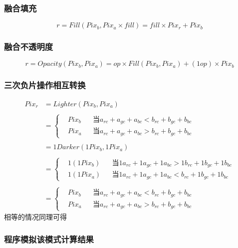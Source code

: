 \subsubsection{ 融合填充}

$$r=Fill(Pix_b,Pix_a\times fill) =fill\times Pix_r+ Pix_b$$

\subsubsection{ 融合不透明度}

$$r=Opacity(Pix_b,Pix_a)=op\times Fill(Pix_b,Pix_a)+(1op)\times Pix_b $$

\subsubsection{ 三次负片操作相互转换}

$$\begin{aligned}Pix_r& =Lighter(Pix_b,Pix_a)\\\\&=\left\{\begin{aligned}&Pix_b &&当 a_{rc}+a_{gc}+a_{bc}<b_{rc}+b_{gc}+b_{bc}\\&Pix_a&&当a_{rc}+a_{gc}+a_{bc}>b_{rc}+b_{gc}+b_{bc}\end{aligned}\right.\\\\&=1Darker(1Pix_b,1Pix_a)\\\\&=\left\{\begin{aligned}&1(1Pix_b) &&当 1a_{rc}+1a_{gc}+1a_{bc}>1b_{rc}+1b_{gc}+1b_{bc}\\&1(1Pix_a)&& 当 1a_{rc}+1a_{gc}+1a_{bc}<b_{rc}+1b_{gc}+1b_{bc}\end{aligned}\right. \\\\&=\left\{\begin{aligned}&Pix_b&&当 a_{rc}+a_{gc}+a_{bc}<b_{rc}+b_{gc}+b_{bc}\\&Pix_a&& 当 a_{rc}+a_{gc}+a_{bc}>b_{rc}+b_{gc}+b_{bc}\end{aligned}\right.\end{aligned}$$
相等的情况同理可得

\subsubsection{ 程序模拟该模式计算结果}

